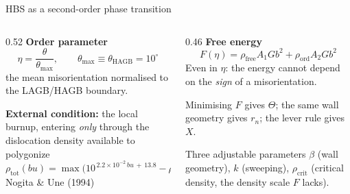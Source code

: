 \documentclass[10pt,aspectratio=169]{beamer}
\begin{document}
\begin{frame}{HBS as a second-order phase transition}
  \begin{columns}[T]
    \begin{column}{0.52\textwidth}
      \textbf{Order parameter}
      \[ \eta = \frac{\theta}{\theta_{\max}}, \qquad
         \theta_{\max} \equiv \theta_{\text{HAGB}} = 10^\circ \]
      the mean misorientation normalised to the LAGB/HAGB boundary.

      \vspace{0.5em}
      \textbf{External condition:} the local burnup, entering \emph{only} through the
      dislocation density available to polygonize
      \[ \rho_{\text{tot}}(bu) = \max\!\big(10^{\,2.2\times10^{-2}\,bu\,+\,13.8}-\rho_{\text{crit}},\,0\big) \]
      \hfill\footnotesize Nogita \& Une (1994)
    \end{column}
    \begin{column}{0.46\textwidth}
      \textbf{Free energy}
      \[ F(\eta) = \rho_{\text{free}}A_1Gb^2 + \rho_{\text{ord}}A_2Gb^2 \]
      Even in $\eta$: the energy cannot depend on the \emph{sign} of a misorientation.

      \vspace{0.5em}
      Minimising $F$ gives $\Theta$; the same wall geometry gives $r_n$;
      the lever rule gives $X$.

      \vspace{0.5em}
      \begin{block}{Three adjustable parameters}
        $\beta$ (wall geometry), $k$ (sweeping), $\rho_{\text{crit}}$ (critical density,
        the density scale $F$ lacks).
      \end{block}
    \end{column}
  \end{columns}
\end{frame}
\end{document}
